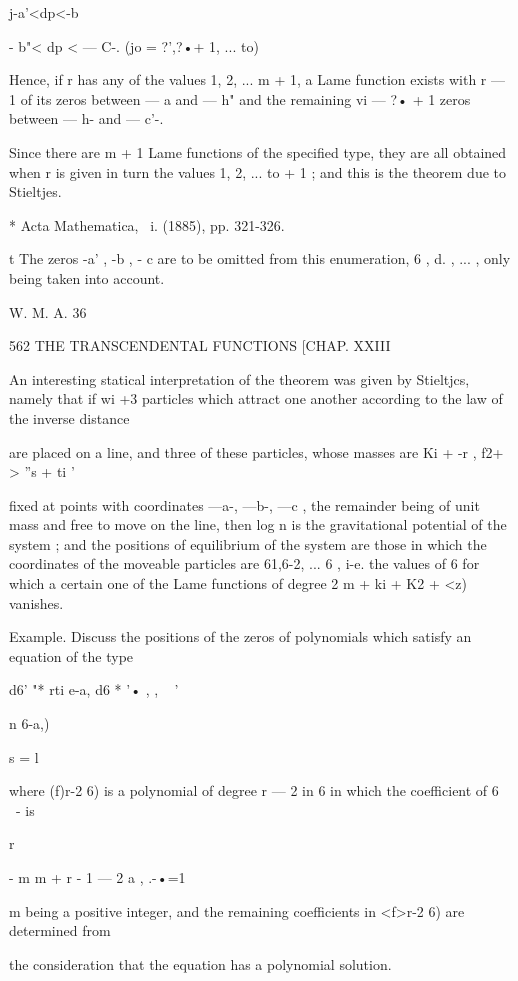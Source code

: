 {{{{{{{j-a'<dp<-b%

 - b"< dp < — C-. (jo = ?',?•+ 1, ... to)

Hence, if r has any of the values 1, 2, ... m + 1, a Lame function
exists with r — 1 of its zeros between — a and — h" and the remaining
vi — ?• + 1 zeros between — h- and — c'-.

Since there are m + 1 Lame functions of the specified type, they are
all obtained when r is given in turn the values 1, 2, ... to + 1 ; and
this is the theorem due to Stieltjes.

* Acta Mathematica, \ i. (1885), pp. 321-326.

t The zeros -a' , -b , - c are to be omitted from this enumeration, 6
, d. , ... , only being taken into account.

W. M. A. 36



562 THE TRANSCENDENTAL FUNCTIONS [CHAP. XXIII

An interesting statical interpretation of the theorem was given by
Stieltjcs, namely that if wi +3 particles which attract one another
according to the law of the inverse distance

are placed on a line, and three of these particles, whose masses are
Ki + -r , f2+ > ''s + ti '

fixed at points with coordinates —a-, —b-, —c , the remainder being of
unit mass and free to move on the line, then log n is the
gravitational potential of the system ; and the positions of
equilibrium of the system are those in which the coordinates of the
moveable particles are 61,6-2, ... 6 , i-e. the values of 6 for which
a certain one of the Lame functions of degree 2 m + ki + K2 + <z)
vanishes.

Example. Discuss the positions of the zeros of polynomials which
satisfy an equation of the type

d6' "* rti e-a, d6 * '• , , ~ '

n 6-a,)

s = l

where (f)r-2 6) is a polynomial of degree r — 2 in 6 in which the
coefficient of 6 ~- is

r

- m m + r - 1 — 2 a , .-•=1

m being a positive integer, and the remaining coefficients in <f>r-2
6) are determined from

the consideration that the equation has a polynomial solution.

}}}}}}}
